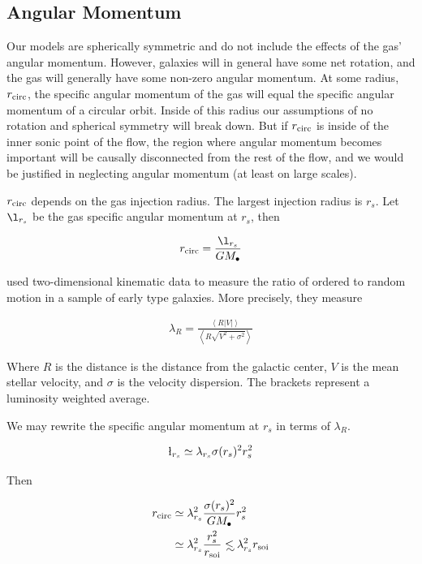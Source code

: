 \documentclass[usenatbib,fleqn]{mn2e}
\newcommand\lsim{\mathrel{\rlap{\lower4pt\hbox{\hskip1pt$\sim$}}
    \raise1pt\hbox{$<$}}}
\newcommand{\rs}{r_s}
\newcommand{\rcirc}{r_{\rm circ}}
\newcommand{\lrs}{\l_{\rs}}
\newcommand{\lambdars}{\lambda_{\rs}}
\newcommand{\Mbh}[1][]{M_{\bullet#1}}
\newcommand{\soi}{\rm soi}
\newcommand{\rsoi}{r_{\soi}}
\begin{document}



  \subsection{Angular Momentum}
  \label{sec:ang}
  Our models are spherically symmetric and do not include the effects of
  the gas' angular momentum. However, galaxies will in general have some
  net rotation, and the gas will generally have some non-zero angular
  momentum. At some radius, $\rcirc$, the specific angular momentum of
  the gas will equal the specific angular momentum of a circular
  orbit. Inside of this radius our assumptions of no rotation and
  spherical symmetry will break down. But if $\rcirc$ is inside of the
  inner sonic point of the flow, the region where angular momentum
  becomes important will be causally disconnected from the rest of the
  flow, and we would be justified in neglecting angular momentum (at
  least on large scales).

  $\rcirc$ depends on the gas injection radius. The largest
  injection radius is $\rs$. Let $\lrs$ be the gas specific angular
  momentum at $\rs$, then 

  \begin{align}
    \rcirc=\frac{\lrs}{G \Mbh}
  \end{align}

  \citet{EmsellemCappellari+:2007a} used two-dimensional kinematic
  data to measure the ratio of ordered to random motion in a sample of
  early type galaxies. More precisely, they measure

  \begin{align}
    \lambda_R=\frac{\left<R|V|\right>}{\left<R\sqrt{V^2+\sigma^2}\right>}
  \end{align}

  Where $R$ is the distance is the distance from the galactic center, $V$ is
  the mean stellar velocity, and $\sigma$ is the velocity
  dispersion. The brackets represent a luminosity weighted average.

  We may rewrite the specific angular momentum at $\rs$ in terms of $\lambda_R$.

  \begin{align}
    \lrs\simeq\lambdars \sigma(\rs)^2 \rs^2
  \end{align}

  Then

  \begin{align}
    \rcirc&\simeq\lambdars^2 \frac{\sigma(\rs)^2}{G \Mbh} \rs^2\\
    &\simeq\lambdars^2 \frac{\rs^2}{\rsoi} \lsim \lambdars^2 \rsoi
  \end{align}
\end{document}
